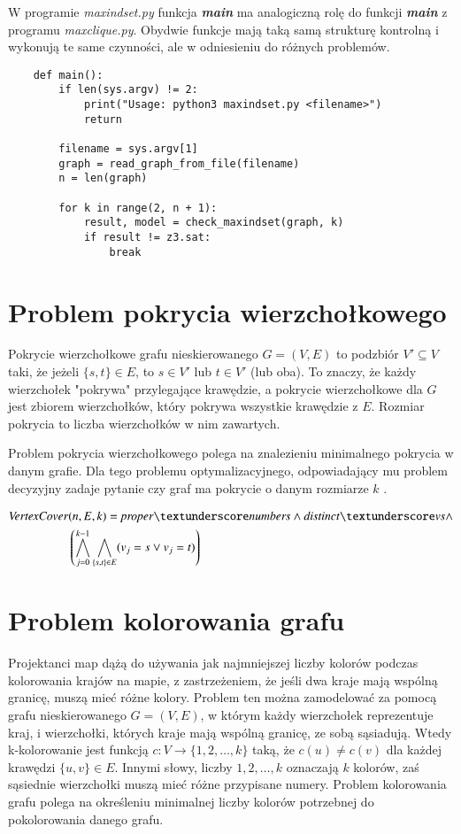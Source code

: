 W programie \textit{maxindset.py} funkcja \textit{\textbf{main}} ma analogiczną rolę do funkcji \textit{\textbf{main}} z programu \textit{maxclique.py}. Obydwie funkcje mają taką samą strukturę kontrolną i wykonują te same czynności, ale w odniesieniu do różnych problemów. 

\begin{lstlisting}
	def main():
		if len(sys.argv) != 2:
			print("Usage: python3 maxindset.py <filename>")
			return
		
		filename = sys.argv[1]
		graph = read_graph_from_file(filename)
		n = len(graph)
		
		for k in range(2, n + 1):
			result, model = check_maxindset(graph, k)
			if result != z3.sat:
				break
\end{lstlisting}


\section{Problem pokrycia wierzchołkowego}
Pokrycie wierzchołkowe grafu nieskierowanego $G = (V, E)$ to podzbiór $V' \subseteq V$ taki, że jeżeli $\{s, t\} \in E$, to $s \in V'$ lub $t \in V'$ (lub oba). To znaczy, że każdy wierzchołek "pokrywa" przylegające krawędzie, a pokrycie wierzchołkowe dla \(G\) jest zbiorem wierzchołków, który pokrywa wszystkie krawędzie z \(E\). Rozmiar pokrycia to liczba wierzchołków w nim zawartych.

Problem pokrycia wierzchołkowego polega na znalezieniu minimalnego pokrycia w danym grafie. Dla tego problemu optymalizacyjnego, odpowiadający mu problem decyzyjny zadaje pytanie czy graf ma pokrycie o danym rozmiarze \(k\) \cite{CormenLRS0023376}.

\begin{align*}
	\VertexCover&(n, E, k) = \propernumbers \land \distinctvs \land \\
	&\left( \bigwedge_{j=0}^{k-1} \bigwedge_{\{s,t\} \in E} (v_j = s \lor v_j = t) \right)	
\end{align*}


\section{Problem kolorowania grafu}
Projektanci map dążą do używania jak najmniejszej liczby kolorów podczas
kolorowania krajów na mapie, z zastrzeżeniem, że jeśli dwa kraje mają wspólną
granicę, muszą mieć różne kolory. Problem ten można zamodelować za pomocą grafu
nieskierowanego $G = (V, E)$, w którym każdy wierzchołek reprezentuje kraj,
i wierzchołki, których kraje mają wspólną granicę, ze sobą sąsiadują.
Wtedy k-kolorowanie jest funkcją $c\colon V \to \{1, 2, …, k\}$ taką, że $c(u) \neq c(v)$ dla każdej krawędzi $\{u, v\} \in E$. 
Innymi słowy, liczby $1, 2, …, k$
oznaczają \(k\) kolorów, zaś sąsiednie wierzchołki muszą mieć różne przypisane
numery. Problem kolorowania grafu polega na określeniu minimalnej liczby kolorów
potrzebnej do pokolorowania danego grafu.

